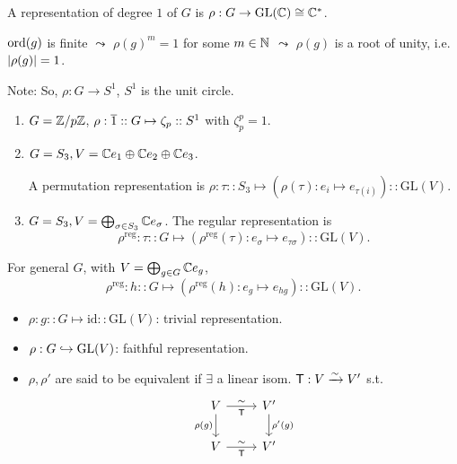 \begin{example}
  A representation of degree $1$ of $G$ is $\rho: G \to \text{GL}(\mathbb{C})
  \cong \mathbb{C}^*$.

  $\operatorname{ord}(g)$ is finite $\leadsto$ $\rho(g)^m = 1$ for some $m \in \mathbb{N}$
  $\leadsto$ $\rho(g)$ is a root of unity, i.e. $\lvert\rho(g)\rvert = 1$.

  Note: So, $\rho: G \to S^1$, $S^1$ is the unit circle.

  \begin{enumerate}
    \item $G = {\mathbb{Z}}/{p\mathbb{Z}}$,
      $\rho: \overline{1} :: G \mapsto \zeta_p :: S^1$ with $\zeta_p^p = 1$.
    \item $G = S_3, V = \mathbb{C} e_1 \oplus \mathbb{C} e_2 \oplus \mathbb{C} e_3$.

      A permutation representation is
      $\rho: \tau :: S_3 \mapsto (\rho(\tau): e_i \mapsto e_{\tau(i)})
      :: \text{GL}(V)$.

    \item $G = S_3, V = \bigoplus_{\sigma \in S_3} \mathbb{C} e_{\sigma}$.
      The regular representation is
      \[ \rho^{\text{reg}}: \tau :: G \mapsto
      (\rho^{\text{reg}}(\tau): e_{\sigma} \mapsto e_{\tau \sigma})
      :: \text{GL}(V). \]
  \end{enumerate}
\end{example}

For general $G$, with $V = \bigoplus_{g\in G} \mathbb{C} e_g$,
\[ \rho^{\text{reg}}: h :: G \mapsto
  (\rho^{\text{reg}}(h): e_{g} \mapsto e_{hg})
:: \text{GL}(V). \]

\begin{definition} \mbox{}
  \begin{itemize}
    \item $\rho: g :: G \mapsto \text{id} :: \text{GL}(V)$:
      trivial representation.
    \item $\rho: G \hookrightarrow \text{GL}(V)$: faithful representation.
    \item $\rho, \rho'$ are said to be equivalent if $\exists$ a linear isom.
      ${\sf T}: V \xrightarrow{\sim} V'$ s.t.
      \[
        \begin{tikzcd}
          V \arrow[d, "\rho(g)"'] \arrow[r, "{\sf T}"', "\sim"] & V' \arrow[d, "\rho'(g)"] \\
          V \arrow[r, "{\sf T}"', "\sim"] & V'
        \end{tikzcd}
      \]
  \end{itemize}
\end{definition}

